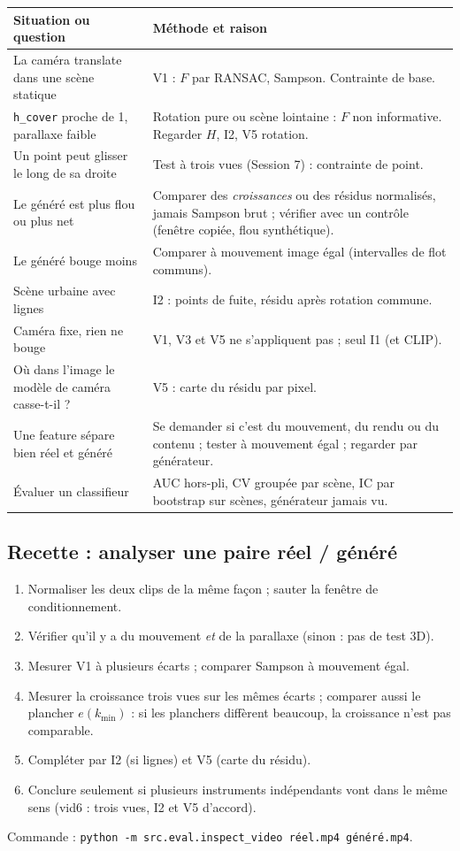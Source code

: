 \documentclass[11pt,a4paper]{article}
\begin{document}
\begin{center}\small
\begin{tabular}{p{6.3cm}p{8.7cm}}
\toprule
Situation ou question & Méthode et raison \\
\midrule
La caméra translate dans une scène statique & V1 : $F$ par RANSAC, Sampson. Contrainte de base. \\
\texttt{h\_cover} proche de 1, parallaxe faible & Rotation pure ou scène lointaine : $F$ non informative. Regarder $H$, I2, V5 rotation. \\
Un point peut glisser le long de sa droite & Test à trois vues (Session 7) : contrainte de point. \\
Le généré est plus flou ou plus net & Comparer des \emph{croissances} ou des résidus normalisés, jamais Sampson brut ; vérifier avec un contrôle (fenêtre copiée, flou synthétique). \\
Le généré bouge moins & Comparer à mouvement image égal (intervalles de flot communs). \\
Scène urbaine avec lignes & I2 : points de fuite, résidu après rotation commune. \\
Caméra fixe, rien ne bouge & V1, V3 et V5 ne s'appliquent pas ; seul I1 (et CLIP). \\
Où dans l'image le modèle de caméra casse-t-il ? & V5 : carte du résidu par pixel. \\
Une feature sépare bien réel et généré & Se demander si c'est du mouvement, du rendu ou du contenu ; tester à mouvement égal ; regarder par générateur. \\
Évaluer un classifieur & AUC hors-pli, CV groupée par scène, IC par bootstrap sur scènes, générateur jamais vu. \\
\bottomrule
\end{tabular}
\end{center}

\subsection{Recette : analyser une paire réel / généré}
\begin{enumerate}
  \item Normaliser les deux clips de la même façon ; sauter la fenêtre de conditionnement.
  \item Vérifier qu'il y a du mouvement \emph{et} de la parallaxe (sinon : pas de test 3D).
  \item Mesurer V1 à plusieurs écarts ; comparer Sampson à mouvement égal.
  \item Mesurer la croissance trois vues sur les mêmes écarts ; comparer aussi le plancher
        $e(k_{\min})$ : si les planchers diffèrent beaucoup, la croissance n'est pas comparable.
  \item Compléter par I2 (si lignes) et V5 (carte du résidu).
  \item Conclure seulement si plusieurs instruments indépendants vont dans le même sens (vid6 : trois vues,
        I2 et V5 d'accord).
\end{enumerate}
Commande : \texttt{python -m src.eval.inspect\_video réel.mp4 généré.mp4}.
\end{document}
